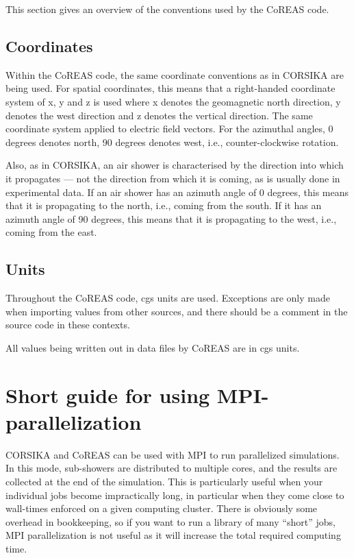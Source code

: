 \documentclass[a4paper,10pt]{article}
\begin{document}
This section gives an overview of the conventions used by the CoREAS code.

\subsection{Coordinates}

Within the CoREAS code, the same coordinate conventions as in CORSIKA are being used. For spatial coordinates, this means that a right-handed coordinate system of x, y and z is used where x denotes the geomagnetic north direction, y denotes the west direction and z denotes the vertical direction. The same coordinate system applied to electric field vectors. For the azimuthal angles, 0 degrees denotes north, 90 degrees denotes west, i.e., counter-clockwise rotation.

Also, as in CORSIKA, an air shower is characterised by the direction into which it propagates --- not the direction from which it is coming, as is usually done in experimental data. If an air shower has an azimuth angle of 0 degrees, this means that it is propagating to the north, i.e., coming from the south. If it has an azimuth angle of 90 degrees, this means that it is propagating to the west, i.e., coming from the east.

\subsection{Units}

Throughout the CoREAS code, cgs units are used. Exceptions are only made when importing values from other sources, and there should be a comment in the source code in these contexts.

All values being written out in data files by CoREAS are in cgs units.

\section {Short guide for using MPI-parallelization} \label{sec:mpiparallel}

CORSIKA and CoREAS can be used with MPI to run parallelized simulations. In this mode, sub-showers are distributed to multiple cores, and the results are collected at the end of the simulation. This is particularly useful when your individual jobs become impractically long, in particular when they come close to wall-times enforced on a given computing cluster. There is obviously some overhead in bookkeeping, so if you want to run a library of many ``short'' jobs, MPI parallelization is not useful as it will increase the total required computing time.
\end{document}
